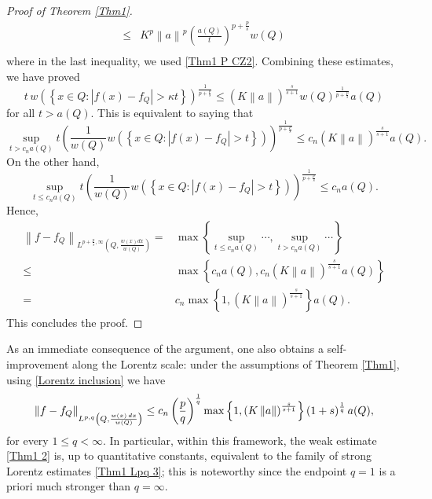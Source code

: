 \documentclass[reqno, 10pt, oneside]{amsart}
\numberwithin{equation}{section}
\newcommand{\strt}[1]{\rule{0pt}{#1}}
\numberwithin{theorem}{section}
\newcommand{\1}{{\rm 1\hspace*{-0.4ex}%
\rule{0.1ex}{1.52ex}\hspace*{0.2ex}}}
\begin{document}
\begin{proof}[Proof of Theorem \ref{Thm1}]
\begin{align*}
			\le & K^p \left\| a \right\| ^p \left( \frac{a(Q)}{t}\right)^{p+\frac{p}{s}}  w(Q)\\
		\end{align*}
		where in the last inequality, we used \eqref{Thm1 P CZ2}.  Combining these estimates, we have proved 
		\begin{equation*}
			t \, w\left(  \left\lbrace x\in Q : |f(x)-f_Q| > \kappa t \right\rbrace \right)  ^\frac{1}{p+\frac{p}{s}}  \le  \left( K \left\| a \right\| \right)^{\frac{s}{s+1}}  w(Q)^\frac{1}{p+\frac{p}{s}} a(Q) 
		\end{equation*}
		for all $t>a(Q)$. This is equivalent to saying that 
		\begin{equation}\label{Thm1 P main estimation 2}
			\sup_{t>c_n a(Q)} t \left( \frac{1}{w(Q)} w\left(  \left\lbrace x\in Q : |f(x)-f_Q| >  t \right\rbrace \right) \right) ^\frac{1}{p+\frac{p}{s}}  \le  c_n \left( K \left\| a \right\| \right)^{\frac{s}{s+1}} a(Q) .
		\end{equation}
		On the other hand, 
		\begin{equation*}
			\sup_{t\le c_n a(Q) } t \left( \frac{1}{w(Q)} w\left(  \left\lbrace x\in Q : |f(x)-f_Q| >  t \right\rbrace \right) \right) ^\frac{1}{p+\frac{p}{s}}  \le  c_n a(Q) .
		\end{equation*}
		Hence,
		\begin{align*}
			\left\| f - f_Q \right\| _{L^{p+\frac{p}{s},\infty}\left( Q, \frac{w(x)dx}{w(Q)}\right) } 
			= & \max \left\lbrace \sup_{t\le c_n a(Q) } \cdots ,  \sup_{t>c_n a(Q)} \cdots   \right\rbrace \\
			\le & \max \left\lbrace c_n a(Q)  ,  c_n \left( K \left\| a \right\| \right)^{\frac{s}{s+1}}   a(Q)  \right\rbrace \\
			= & c_n \max \left\lbrace 1   ,  \left( K \left\| a \right\| \right)^{\frac{s}{s+1}}     \right\rbrace a(Q) .
		\end{align*}	
        This concludes the proof.
\end{proof}



As an immediate consequence of the argument, one also obtains a self-improvement along the Lorentz scale: under the assumptions of Theorem \ref{Thm1}, using \eqref{Lorentz inclusion} we have 
\begin{equation}\label{Thm1 Lpq 3}
		\left\| f - f_Q\right\|_{\strt{2.3ex} L^{p,q}\left( Q, \frac{w(x)\,dx}{w(Q)}\right)} \le c_n \left( \frac{p}{q}\right)^{\frac{1}{q}} \max\left\{ 1 , \left( K \left\| a \right\| \right)^{\frac{s}{s+1}} \right\} (1+s)^{\frac{1}{q}}\, a(Q),
	\end{equation}
for every $1\le q<\infty$. In particular, within this framework, the weak
estimate \eqref{Thm1 2} is, up to quantitative constants, equivalent to the family of strong Lorentz estimates \eqref{Thm1 Lpq 3}; this is noteworthy since the endpoint $q=1$ is a priori much stronger than $q=\infty$.
\end{document}
